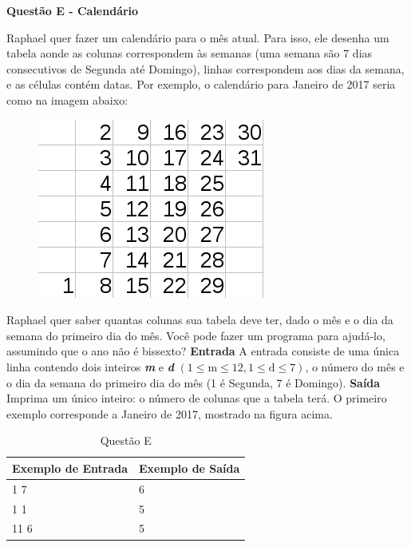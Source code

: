 \documentclass[a4paper, 12pt]{article}
\begin{document}
\newpage %
\begin{center}
\textbf{{\Large Questão E - Calendário}}
\end{center}
\vspace{5pt}
Raphael quer fazer um calendário para o mês atual. Para isso, ele desenha um tabela aonde as colunas correspondem às semanas (uma semana são 7 dias consecutivos de Segunda até Domingo), linhas correspondem aos dias da semana, e as células contém datas. Por exemplo, o calendário para Janeiro de 2017 seria como na imagem abaixo:
\begin{figure}[H]
	\centering
	\includegraphics[scale=0.9]{Calendario.png} 
\end{figure} 
Raphael quer saber quantas colunas sua tabela deve ter, dado o mês e o dia da semana do primeiro dia do mês. Você pode fazer um programa para ajudá-lo, assumindo que o ano não é bissexto?
\newline \newline
\textbf{{\large Entrada}} \newline
A entrada consiste de uma única linha contendo dois inteiros \textbf{\textit{m}} e \textbf{\textit{d}} 
$(1 \leq \textrm{m} \leq 12\textrm{,} \, 1 \leq \textrm{d} \leq 7)$, o número do mês e o dia da semana do primeiro dia do mês (1 é Segunda, 7 é Domingo).
\newline \newline
\textbf{{\large Saída}} \newline
Imprima um único inteiro: o número de colunas que a tabela terá. O primeiro exemplo corresponde a Janeiro de 2017, mostrado na figura acima. 
\newline
\begin{table}[H]
	\centering
	\begin{tabular}{|l|l|}
	\hline
	\textbf{Exemplo de Entrada} & \textbf{Exemplo de Saída} \\ \hline
	1 7 & 6 \\ \hline
	1 1 & 5 \\ \hline
	11 6 & 5 \\ \hline
	\end{tabular}
	\caption{Questão E}
	\label{tabela5}
\end{table}
\end{document}
